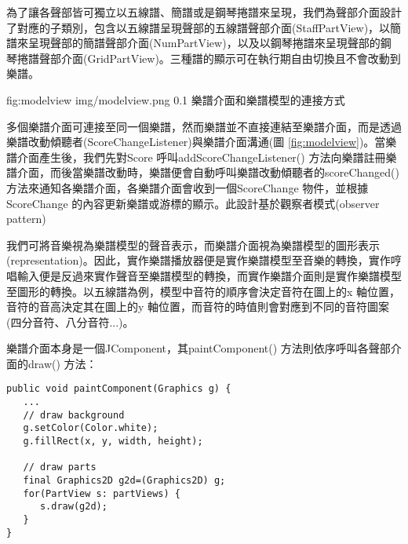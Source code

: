 \documentclass[12pt,a4paper,oneside]{report}
\begin{document}
為了讓各聲部皆可獨立以五線譜、簡譜或是鋼琴捲譜來呈現，我們為聲部介面設計了對應的子類別，包含以五線譜呈現聲部的五線譜聲部介面(StaffPartView)，以簡譜來呈現聲部的簡譜聲部介面(NumPartView)，以及以鋼琴捲譜來呈現聲部的鋼琴捲譜聲部介面(GridPartView)。三種譜的顯示可在執行期自由切換且不會改動到樂譜。


\figurewithcaption
{fig:modelview}
{img/modelview.png}
{0.1}
{樂譜介面和樂譜模型的連接方式}

多個樂譜介面可連接至同一個樂譜，然而樂譜並不直接連結至樂譜介面，而是透過樂譜改動傾聽者(ScoreChangeListener)與樂譜介面溝通(圖 \ref{fig:modelview})。當樂譜介面產生後，我們先對Score 呼叫addScoreChangeListener() 方法向樂譜註冊樂譜介面，而後當樂譜改動時，樂譜便會自動呼叫樂譜改動傾聽者的scoreChanged() 方法來通知各樂譜介面，各樂譜介面會收到一個ScoreChange 物件，並根據ScoreChange 的內容更新樂譜或游標的顯示。此設計基於觀察者模式(observer pattern)\cite{designPatterns}

我們可將音樂視為樂譜模型的聲音表示，而樂譜介面視為樂譜模型的圖形表示(representation)。因此，實作樂譜播放器便是實作樂譜模型至音樂的轉換，實作哼唱輸入便是反過來實作聲音至樂譜模型的轉換，而實作樂譜介面則是實作樂譜模型至圖形的轉換。以五線譜為例，模型中音符的順序會決定音符在圖上的x 軸位置，音符的音高決定其在圖上的y 軸位置，而音符的時值則會對應到不同的音符圖案(四分音符、八分音符...)。

樂譜介面本身是一個JComponent，其paintComponent() 方法則依序呼叫各聲部介面的draw() 方法：

\begin{lstlisting}
public void paintComponent(Graphics g) {
   ...
   // draw background
   g.setColor(Color.white);
   g.fillRect(x, y, width, height);

   // draw parts
   final Graphics2D g2d=(Graphics2D) g;
   for(PartView s: partViews) {
      s.draw(g2d);  
   }
}
\end{lstlisting}


\end{document}
